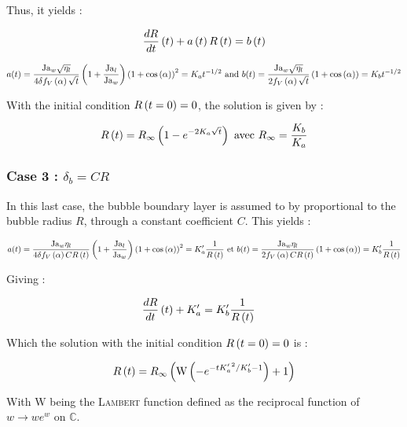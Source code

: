 Thus, it yields :

\begin{align}
\frac{dR}{dt}\left( t \right)+a\left( t \right)R\left( t \right)=b\left( t \right)
\end{align}

\begin{align}
\label{eq:coeff_expgrowth}
a(t)=\frac{\mathrm{Ja}_{w}\sqrt{\eta_{l}}}{4\delta f_{V}\left( \alpha \right)\sqrt{t}}\left( 1+\frac{\mathrm{Ja}_{l}}{\mathrm{Ja}_{w}} \right)\left( 1+\mathrm{cos}\left( \alpha \right) \right)^{2}=K_{a}t^{-1/2} \text{ and } b(t)=\frac{\mathrm{Ja}_{w}\sqrt{\eta_{l}}}{2f_{V}\left( \alpha \right)\sqrt{t}}\left( 1+\mathrm{cos}\left( \alpha \right) \right)=K_ {b}t^{-1/2}
\end{align}

With the initial condition $R\left( t=0 \right)=0$, the solution is given by : 

\begin{align}
R\left( t \right)=R_{\infty}\left( 1-e^{-2K_{a}\sqrt{t}} \right) \text{ avec } R_{\infty}=\frac{K_{b}}{K_{a}}
\end{align}

\npar
\subsubsection{Case 3 : $\delta_{b}=CR$}
\npar

In this last case, the bubble boundary layer is assumed to by proportional to the bubble radius $R$, through a constant coefficient $C$. This yields :


\begin{align}
a(t)=\frac{\mathrm{Ja}_{w}\eta_{l}}{4\delta f_{V}\left( \alpha \right)CR\left( t \right)}\left( 1+\frac{\mathrm{Ja}_{l}}{\mathrm{Ja}_{w}} \right)\left( 1+\mathrm{cos}\left( \alpha \right) \right)^{2}=K'_{a}\frac{1}{R\left( t \right)} \text{ et } b(t)=\frac{\mathrm{Ja}_{w}\eta_{l}}{2f_{V}\left( \alpha \right)CR\left( t \right)}\left( 1+\mathrm{cos}\left( \alpha \right) \right)=K'_ {b}\frac{1}{R\left( t \right)}
\end{align}

Giving :

\begin{align}
&\frac{dR}{dt}\left( t \right) + K'_{a} = K'_{b}\frac{1}{R\left( t \right)}
\end{align}

Which the solution with the initial condition $R\left( t=0 \right)=0$ is :

\begin{align}
R\left( t \right)=R_{\infty}\left(  \text{W}\left( -e^{-t{K'_{a}}^{2}/K'_{b}-1}  \right) +1 \right)
\end{align}

With $\text{W}$ being the \textsc{Lambert} function defined as the reciprocal function of $w \rightarrow we^{w}$ on $\mathbb{C}$.


